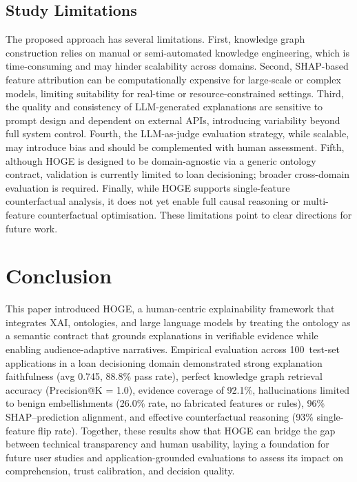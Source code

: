 \documentclass[lnbip]{svmultln}
\begin{document}
\subsection{Study Limitations}
The proposed approach has several limitations. First, knowledge graph construction relies on manual or semi-automated knowledge engineering, which is time-consuming and may hinder scalability across domains. Second, SHAP-based feature attribution can be computationally expensive for large-scale or complex models, limiting suitability for real-time or resource-constrained settings. Third, the quality and consistency of LLM-generated explanations are sensitive to prompt design and dependent on external APIs, introducing variability beyond full system control. Fourth, the LLM-as-judge evaluation strategy, while scalable, may introduce bias and should be complemented with human assessment. Fifth, although HOGE is designed to be domain-agnostic via a generic ontology contract, validation is currently limited to loan decisioning; broader cross-domain evaluation is required. Finally, while HOGE supports single-feature counterfactual analysis, it does not yet enable full causal reasoning or multi-feature counterfactual optimisation. These limitations point to clear directions for future work.

\section{Conclusion}
This paper introduced HOGE, a human-centric explainability framework that integrates XAI, ontologies, and large language models by treating the ontology as a semantic contract that grounds explanations in verifiable evidence while enabling audience-adaptive narratives. Empirical evaluation across 100~test-set applications in a loan decisioning domain demonstrated strong explanation faithfulness (avg 0.745, 88.8\% pass rate), perfect knowledge graph retrieval accuracy (Precision@K = 1.0), evidence coverage of 92.1\%, hallucinations limited to benign embellishments (26.0\% rate, no fabricated features or rules), 96\% SHAP--prediction alignment, and effective counterfactual reasoning (93\% single-feature flip rate). Together, these results show that HOGE can bridge the gap between technical transparency and human usability, laying a foundation for future user studies and application-grounded evaluations to assess its impact on comprehension, trust calibration, and decision quality.
\end{document}
